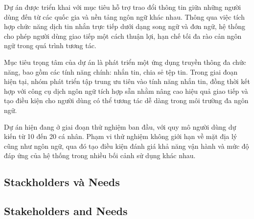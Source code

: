 \documentclass[a4paper, 12pt]{article}
\begin{document}
	Dự án được triển khai với mục tiêu hỗ trợ trao đổi thông tin giữa những người dùng đến từ các quốc gia và nền tảng ngôn ngữ khác nhau. Thông qua việc tích hợp chức năng dịch tin nhắn trực tiếp dưới dạng song ngữ và đơn ngữ, hệ thống cho phép người dùng giao tiếp một cách thuận lợi, hạn chế tối đa rào cản ngôn ngữ trong quá trình tương tác.
	
	Mục tiêu trọng tâm của dự án là phát triển một ứng dụng truyền thông đa chức năng, bao gồm các tính năng chính: nhắn tin, chia sẻ tệp tin. Trong giai đoạn hiện tại, nhóm phát triển tập trung ưu tiên vào tính năng nhắn tin, đồng thời kết hợp với công cụ dịch ngôn ngữ tích hợp sẵn nhằm nâng cao hiệu quả giao tiếp và tạo điều kiện cho người dùng có thể tương tác dễ dàng trong môi trường đa ngôn ngữ.
	
	Dự án hiện đang ở giai đoạn thử nghiệm ban đầu, với quy mô người dùng dự kiến từ 10 đến 20 cá nhân. Phạm vi thử nghiệm không giới hạn về mặt địa lý cũng như ngôn ngữ, qua đó tạo điều kiện đánh giá khả năng vận hành và mức độ đáp ứng của hệ thống trong nhiều bối cảnh sử dụng khác nhau.
	
	\subsection{Stackholders và Needs}
	\subsection{Stakeholders and Needs}
	
\end{document}

